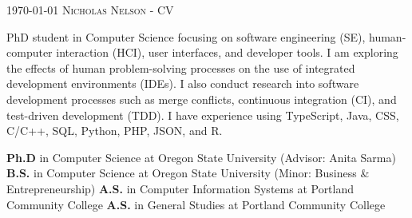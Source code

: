 \documentclass[localFont,alternative]{yaac-another-awesome-cv}
\begin{document}
	\makecvheader

	\makecvfooter
		{\textsc{\today}}
		{\textsc{Nicholas Nelson - CV}}
		{\thepage}

\par{
PhD student in Computer Science focusing on software engineering (SE), human-computer interaction (HCI), user interfaces, and developer tools.
I am exploring the effects of human problem-solving processes on the use of integrated development environments (IDEs).
I also conduct research into software development processes such as merge conflicts, continuous integration (CI), and test-driven development (TDD).
I have experience using TypeScript, Java, CSS, C/C++, SQL, Python, PHP, JSON, and R.
}
\bigskip

\begin{scholarship}
					{\textbf{Ph.D} in Computer Science at Oregon State University (Advisor: Anita Sarma)}
					{\textbf{B.S.} in Computer Science at Oregon State University (Minor: Business \& Entrepreneurship)}
					{\textbf{A.S.} in Computer Information Systems at Portland Community College}
					{\textbf{A.S.} in General Studies at Portland Community College}
\end{scholarship}
\end{document}
